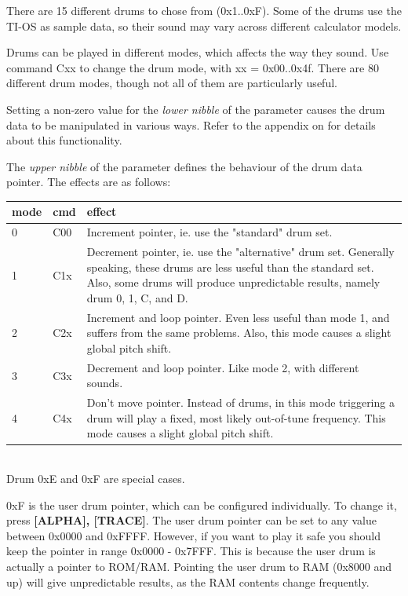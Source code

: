 \documentclass[12pt]{report}	%
\begin{document}
There are 15 different drums to chose from (0x1..0xF). Some of the drums use the TI-OS as sample data, so their sound may vary across different calculator models.

Drums can be played in different modes, which affects the way they sound. Use command Cxx to change the drum mode, with xx = 0x00..0x4f. There are 80 different drum modes, though not all of them are particularly useful.

Setting a non-zero value for the \emph{lower nibble} of the parameter causes the drum data to be manipulated in various ways. Refer to the appendix on  for details about this functionality.

The \emph{upper nibble} of the parameter defines the behaviour of the drum data pointer. The effects are as follows: \newline

\begin{tabularx}{\textwidth}{p{} p{} X}
\textbf{mode} & \textbf{cmd} & \textbf{effect} \\
\hline
0 & C00 & Increment pointer, ie. use the "standard" drum set. \\
1 & C1x & Decrement pointer, ie. use the "alternative" drum set. Generally speaking, these drums are less useful than the standard set. Also, some drums will produce unpredictable results, namely drum 0, 1, C, and D. \\
2 & C2x & Increment and loop pointer. Even less useful than mode 1, and suffers from the same problems. Also, this mode causes a slight global pitch shift. \\
3 & C3x & Decrement and loop pointer. Like mode 2, with different sounds. \\
4 & C4x & Don't move pointer. Instead of drums, in this mode triggering a drum will play a fixed, most likely out-of-tune frequency. This mode causes a slight global pitch shift. \\
\end{tabularx} ~\\

Drum 0xE and 0xF are special cases.

0xF is the user drum pointer, which can be configured individually. To change it, press \textbf{[ALPHA], [TRACE]}.
The user drum pointer can be set to any value between 0x0000 and 0xFFFF. However, if you want to play it safe you should keep the pointer in range 0x0000 - 0x7FFF. This is because the user drum is actually a pointer to ROM/RAM. Pointing the user drum to RAM (0x8000 and up) will give unpredictable results, as the RAM contents change frequently.
\end{document}
